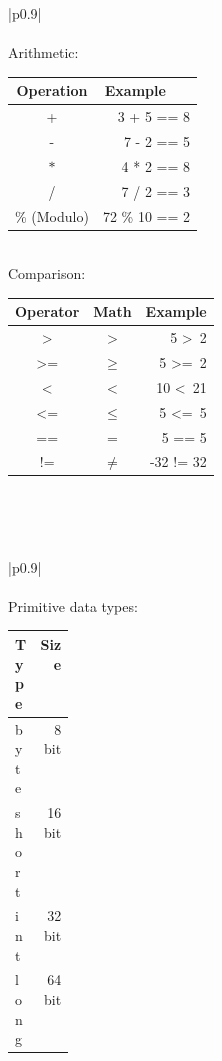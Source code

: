 \documentclass[a4paper, 8pt]{extarticle}
\begin{document}
\begin{minipage}[t]{0.25\linewidth}
\begin{tabular}{|p{0.9\linewidth}|}
\\
\\[-7pt]
Arithmetic:
\\[0pt]
\hspace{3pt}\begin{tabular}{c|r}
Operation & Example\ \ \  \\\hline
+ & 3 + 5 == 8 \\
- & 7 - 2 == 5 \\
$*$ & 4 * 2 == 8 \\
/ & 7 / 2 == 3 \\
\% (Modulo) & 72 \% 10 == 2
\end{tabular}
\\[25pt]
Comparison:
\\[0pt]
\begin{tabular}{c|c|r}
Operator & Math& Example \\\hline
\textgreater & $>$ & 5 \textgreater \ 2\\
\textgreater= & $\geq$ & 5 \textgreater=\ 2\\
\textless & $<$ & 10 \textless\ 21\\
\textless= &$\leq$ & 5 \textless=\ 5\\
== & = & 5 == 5\\
!= & $\neq$ & -32 != 32 
\end{tabular}
\\[31pt]\hline
\end{tabular}
\\[3pt]
\end{minipage}\begin{minipage}[t]{0.25\linewidth}\vspace{0pt}
\begin{tabular}{|p{0.9\linewidth}|}
\\
\\[-7pt]
Primitive data types:
\\[-3pt]
\vspace{0pt}\begin{tabular}[t]{p{0.07\linewidth} r}
Type & Size
\\\hline
byte & 8 bit\\
short & 16 bit\\
int & 32 bit\\
long & 64 bit\\
\end {tabular}
\begin{tabular}[t]{p{0.20\linewidth} p{0.19\linewidth}}

\end{tabular}
\end{tabular}
\end{minipage}
\end{document}

